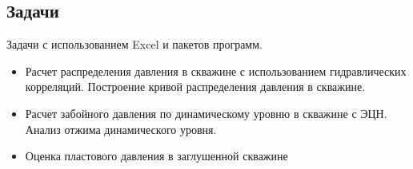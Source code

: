 \subsection{Задачи}

Задачи с использованием Excel и пакетов программ. 

\begin{itemize}
    \item Расчет распределения давления в скважине с использованием гидравлических корреляций. Построение кривой распределения давления в скважине.
    \item Расчет забойного давления по динамическому уровню в скважине с ЭЦН. Анализ отжима динамического уровня. 
    \item Оценка пластового давления в заглушенной скважине
\end{itemize}
